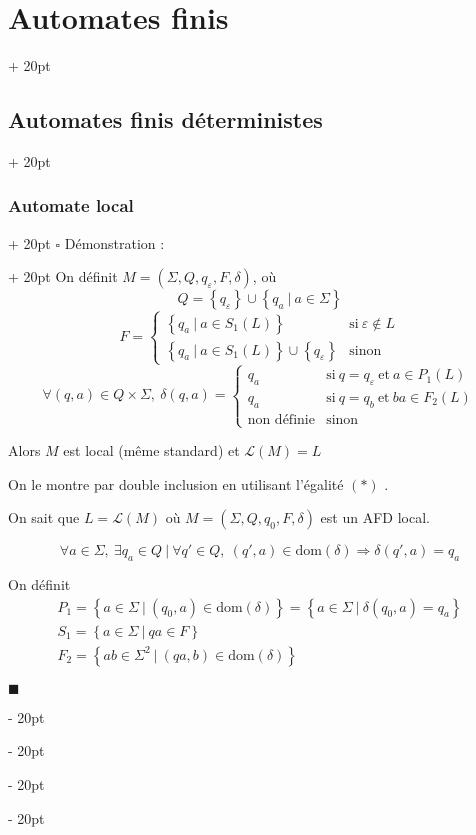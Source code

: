\documentclass[a4paper, 12pt, twoside]{article}
\newcommand{\set}[1]{\left\{ #1 \right\}}
\newcommand{\ind}[1][20pt]{\advance\leftskip + #1}
\newcommand{\deind}[1][20pt]{\advance\leftskip - #1}
\newenvironment{indt}[2][20pt]{#2 \par \ind[#1]}{\par \deind} %
\newenvironment{proof}[1][{Démonstration :}]{\begin{indt}{$\square$ #1}}{$\blacksquare$ \end{indt}}
\begin{document}
\begin{indt}{\section{Automates finis}}
\begin{indt}{\subsection{Automates finis déterministes}}
\begin{indt}{\subsubsection{Automate local}}
\begin{proof}
                On définit $M = (\Sigma, Q, q_\varepsilon, F, \delta)$, où
                \[
                    Q = \set{q_\varepsilon} \cup \set{q_a\ |\ a \in \Sigma}
                \]
                \[
                    F =
                    \begin{cases}
                        \set{q_a\ |\ a \in S_1(L)}
                        & \text{si}\ \varepsilon \notin L
                        \\
                        \set{q_a\ |\ a \in S_1(L)} \cup \set{q_\varepsilon}
                        & \text{sinon}
                    \end{cases}
                \]
                \[
                    \forall (q ,a) \in Q \times \Sigma,\
                    \delta(q, a) =
                    \begin{cases}
                        q_a
                        & \text{si}\ q = q_\varepsilon\ \text{et}\ a \in P_1(L)
                        \\
                        q_a
                        & \text{si}\ q = q_b\ \text{et}\ ba \in F_2(L)
                        \\
                        \text{non définie}
                        & \text{sinon}
                    \end{cases}
                \]

                Alors $M$ est local (même standard) et $\mathcal L(M) = L$

                On le montre par double inclusion en utilisant l'égalité $(*)$ .

                \vspace{12pt}
                
                \boxed{\Leftarrow} On sait que $L = \mathcal L(M)$ où $M = (\Sigma, Q, q_0, F, \delta)$ est un AFD local.

                \[
                    \forall a \in \Sigma,\ \exists q_a \in Q\ |\ \forall q' \in Q,\
                    (q', a) \in \mathrm{dom}(\delta) \Rightarrow \delta(q', a) = q_a
                \]

                On définit
                \[
                    \begin{array}{l}
                        P_1 = \set{a \in \Sigma\ |\ (q_0, a) \in \mathrm{dom}(\delta)}
                        = \set{a \in \Sigma\ |\ \delta(q_0, a) = q_a}
                        \\
                        S_1 = \set{a \in \Sigma\ |\ qa \in F}
                        \\
                        F_2 = \set{ab \in \Sigma^2\ |\ (qa, b) \in \mathrm{dom}(\delta)}
                    \end{array}
                \]


\end{proof}
\end{indt}
\end{indt}
\end{indt}
\end{document}
